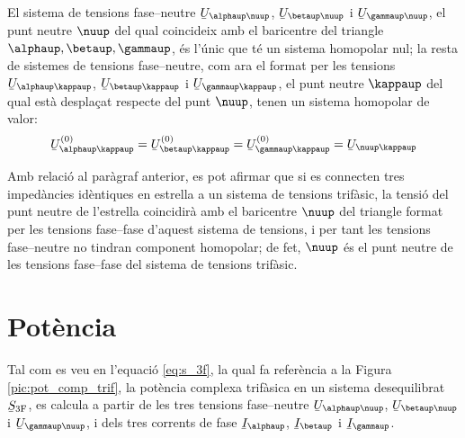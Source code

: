 El sistema de tensions fase--neutre
$\cmplx{U}_{\alphaup\nuup}$, $\cmplx{U}_{\betaup\nuup}$ i $\cmplx{U}_{\gammaup\nuup}$,
el punt neutre $\nuup$ del qual coincideix amb el baricentre del
triangle $\alphaup, \betaup,
 \gammaup$, \'{e}s l'\'{u}nic que t\'{e} un sistema homopolar nul; la resta de sistemes de tensions
 fase--neutre, com ara el format per les tensions $\cmplx{U}_{\alphaup\kappaup}$, $\cmplx{U}_{\betaup\kappaup}$ i $\cmplx{U}_{\gammaup\kappaup}$,
 el punt neutre $\kappaup$ del qual est\`{a} despla\c{c}at respecte del punt $\nuup$, tenen un sistema
 homopolar de valor:
\begin{equation}
    \cmplx{U}_{\alphaup\kappaup}\ap{(0)} = \cmplx{U}_{\betaup\kappaup}\ap{(0)} =
    \cmplx{U}_{\gammaup\kappaup}\ap{(0)} = \cmplx{U}_{\nuup\kappaup}
\end{equation}

Amb relaci\'{o} al par\`{a}graf anterior, es pot afirmar que si es
connecten tres imped\`{a}ncies id\`{e}ntiques en estrella a un sistema
de tensions trif\`{a}sic, la tensi\'{o} del punt neutre de l'estrella
coincidir\`{a} amb el baricentre $\nuup$ del triangle format per les tensions
fase--fase d'aquest sistema de tensions, i per tant les tensions fase--neutre no tindran
component homopolar; de fet, $\nuup$ \'{e}s el punt neutre de les tensions
fase--fase del sistema de tensions trif\`{a}sic.

\section{Pot\`{e}ncia} 

Tal com es veu en l'equaci\'{o} \eqref{eq:s_3f}, la qual fa refer\`{e}ncia a
la Figura \vref{pic:pot_comp_trif}, la pot\`{e}ncia complexa trif\`{a}sica
en un sistema desequilibrat $\cmplx{S}\ped{3F}$, es calcula a partir
de les tres tensions fase--neutre $\cmplx{U}_{\alphaup\nuup}$,
$\cmplx{U}_{\betaup\nuup}$ i $\cmplx{U}_{\gammaup\nuup}$, i dels tres
corrents de fase $\cmplx{I}_\alphaup$, $\cmplx{I}_\betaup$ i
$\cmplx{I}_\gammaup$.


